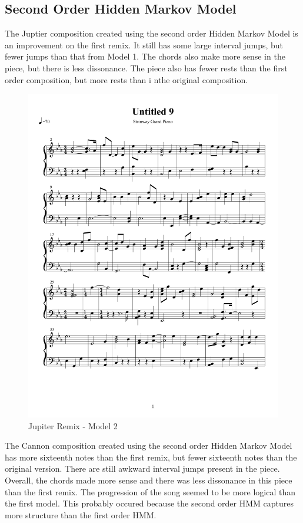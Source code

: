 \documentclass{article} %
\begin{document}
\subsection{Second Order Hidden Markov Model}

The Juptier composition created using the second order Hidden Markov Model is an improvement on the first remix. It still has some large interval jumps, but fewer jumps than that from Model 1. The chords also make more sense in the piece, but there is less dissonance. The piece also has fewer rests than the first order composition, but more rests than i nthe original composition.


\begin{figure}[H]
\centering
\caption{Jupiter Remix - Model 2}
\includegraphics [scale = 0.6] {JupiterRemix2-cropped.pdf}
\end{figure}

The Cannon composition created using the second order Hidden Markov Model has more sixteenth notes than the first remix, but fewer sixteenth notes than the original version. There are still awkward interval jumps present in the piece. Overall, the chords made more sense and there was less dissonance in this piece than the first remix. The progression of the song seemed to be more logical than the first model. This probably occured because the second order HMM captures more structure than the first order HMM.
\end{document}
